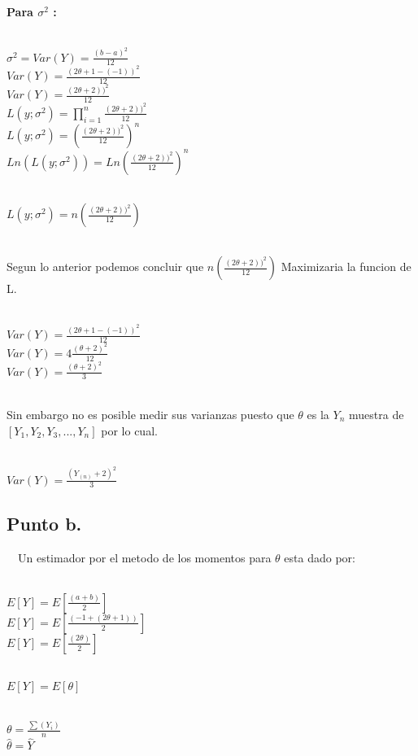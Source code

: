 \documentclass[letterpaper,12pt,onecolumn,titlepage]{article}
\begin{document}
~\\ \textbf{Para $\sigma^{2}$ :}

~\\ $\sigma^{2} = Var(Y) = \frac{(b-a)^2}{12}$
~\\ $Var(Y) = \frac{(2\theta+1-(-1))^2}{12}$
~\\ $Var(Y) = \frac{(2\theta+2))^2}{12}$
~\\ $L(y;\sigma^{2}) = \prod_{i=1}^n{} \frac{(2\theta+2))^2}{12}$
~\\ $L(y;\sigma^{2}) = (\frac{(2\theta+2))^2}{12})^{n}$
~\\ $Ln(L(y;\sigma^{2})) = Ln(\frac{(2\theta+2))^2}{12})^{n}$

~\\ $L(y;\sigma^{2}) = n(\frac{(2\theta+2))^2}{12})$

~\\ Segun lo anterior podemos concluir que \textbf{{$n(\frac{(2\theta+2))^2}{12})$}} Maximizaria la funcion de L.  

~\\ $Var(Y) = \frac{(2\theta+1-(-1))^2}{12}$
~\\ $Var(Y) = 4\frac{(\theta+2)^2}{12}$
~\\ $Var(Y) = \frac{(\theta+2)^2}{3}$

~\\ Sin embargo no es posible medir sus varianzas puesto que $\theta$ es la $Y_{n}$ muestra de $[Y_{1}, Y_{2}, Y_{3},...,Y_{n}]$ por lo cual. 

~\\ $Var(Y) = \frac{(Y_{(n)}+2)^2}{3}$

\subsection{Punto b.}
~\ Un estimador por el metodo de los momentos para $\theta$ esta dado por:

~\\ $E[Y]= E[\frac{(a+b)}{2}]$
~\\ $E[Y]= E[\frac{(-1+(2\theta+1))}{2}]$
~\\ $E[Y]= E[\frac{(2\theta)}{2}]$

~\\ $E[Y]= E[\theta]$

~\\ $\theta = \frac{\sum(Y_{i})}{n}$ 
~\\ $\hat{\theta} = \hat{Y}$


\end{document}
